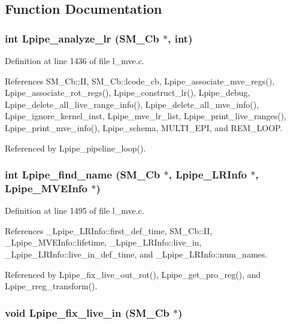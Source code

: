 \subsection{Function Documentation}
\subsubsection{\setlength{\rightskip}{0pt plus 5cm}int Lpipe\_\-analyze\_\-lr (\bf{SM\_\-Cb} $\ast$, int)}\label{l__mve_8h_6c1047b81a3439e75fd433210c0f623d}




Definition at line 1436 of file l\_\-mve.c.

References SM\_\-Cb::II, SM\_\-Cb::lcode\_\-cb, Lpipe\_\-associate\_\-mve\_\-regs(), Lpipe\_\-associate\_\-rot\_\-regs(), Lpipe\_\-construct\_\-lr(), Lpipe\_\-debug, Lpipe\_\-delete\_\-all\_\-live\_\-range\_\-info(), Lpipe\_\-delete\_\-all\_\-mve\_\-info(), Lpipe\_\-ignore\_\-kernel\_\-inst, Lpipe\_\-mve\_\-lr\_\-list, Lpipe\_\-print\_\-live\_\-ranges(), Lpipe\_\-print\_\-mve\_\-info(), Lpipe\_\-schema, MULTI\_\-EPI, and REM\_\-LOOP.

Referenced by Lpipe\_\-pipeline\_\-loop().
\subsubsection{\setlength{\rightskip}{0pt plus 5cm}int Lpipe\_\-find\_\-name (\bf{SM\_\-Cb} $\ast$, \bf{Lpipe\_\-LRInfo} $\ast$, \bf{Lpipe\_\-MVEInfo} $\ast$)}\label{l__mve_8h_1d9d11bd30f05f00be63a23da7dec921}




Definition at line 1495 of file l\_\-mve.c.

References \_\-Lpipe\_\-LRInfo::first\_\-def\_\-time, SM\_\-Cb::II, \_\-Lpipe\_\-MVEInfo::lifetime, \_\-Lpipe\_\-LRInfo::live\_\-in, \_\-Lpipe\_\-LRInfo::live\_\-in\_\-def\_\-time, and \_\-Lpipe\_\-LRInfo::num\_\-names.

Referenced by Lpipe\_\-fix\_\-live\_\-out\_\-rot(), Lpipe\_\-get\_\-pro\_\-reg(), and Lpipe\_\-rreg\_\-transform().
\subsubsection{\setlength{\rightskip}{0pt plus 5cm}void Lpipe\_\-fix\_\-live\_\-in (\bf{SM\_\-Cb} $\ast$)}\label{l__mve_8h_e28dc02e45f01521186b53b02cc358eb}




